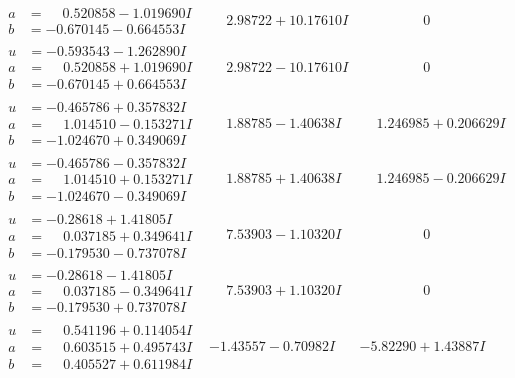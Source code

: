 \documentclass[1p]{elsarticle_modified}
\theoremstyle{definition}
\begin{document}
$$\begin{array}{c|c|c}
\begin{aligned}
a &= \phantom{-}0.520858 - 1.019690 I \\
b &= -0.670145 - 0.664553 I\end{aligned}
 & \phantom{-}2.98722 + 10.17610 I & \phantom{-0.000000 } 0 \\ \hline\begin{aligned}
u &= -0.593543 - 1.262890 I \\
a &= \phantom{-}0.520858 + 1.019690 I \\
b &= -0.670145 + 0.664553 I\end{aligned}
 & \phantom{-}2.98722 - 10.17610 I & \phantom{-0.000000 } 0 \\ \hline\begin{aligned}
u &= -0.465786 + 0.357832 I \\
a &= \phantom{-}1.014510 - 0.153271 I \\
b &= -1.024670 + 0.349069 I\end{aligned}
 & \phantom{-}1.88785 - 1.40638 I & \phantom{-}1.246985 + 0.206629 I \\ \hline\begin{aligned}
u &= -0.465786 - 0.357832 I \\
a &= \phantom{-}1.014510 + 0.153271 I \\
b &= -1.024670 - 0.349069 I\end{aligned}
 & \phantom{-}1.88785 + 1.40638 I & \phantom{-}1.246985 - 0.206629 I \\ \hline\begin{aligned}
u &= -0.28618 + 1.41805 I \\
a &= \phantom{-}0.037185 + 0.349641 I \\
b &= -0.179530 - 0.737078 I\end{aligned}
 & \phantom{-}7.53903 - 1.10320 I & \phantom{-0.000000 } 0 \\ \hline\begin{aligned}
u &= -0.28618 - 1.41805 I \\
a &= \phantom{-}0.037185 - 0.349641 I \\
b &= -0.179530 + 0.737078 I\end{aligned}
 & \phantom{-}7.53903 + 1.10320 I & \phantom{-0.000000 } 0 \\ \hline\begin{aligned}
u &= \phantom{-}0.541196 + 0.114054 I \\
a &= \phantom{-}0.603515 + 0.495743 I \\
b &= \phantom{-}0.405527 + 0.611984 I\end{aligned}
 & -1.43557 - 0.70982 I & -5.82290 + 1.43887 I \\ \hline\begin{aligned}

\end{aligned}
\end{array}$$
\end{document}
